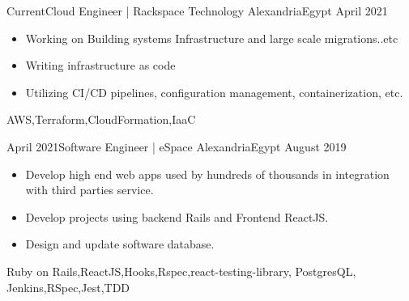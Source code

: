 \begin{experiences}
  \experience
    {Current}{Cloud Engineer | Rackspace Technology }{Alexandria}{Egypt}
    {April 2021}   {
                      \begin{itemize}
                        \item  Working on Building systems Infrastructure and large scale migrations..etc
                        \item Writing infrastructure as code
                        \item Utilizing CI/CD pipelines, configuration management, containerization, etc.
                      \end{itemize}
                    }
                {AWS,Terraform,CloudFormation,IaaC} 
 \emptySeparator

  \experience
    {April 2021}{Software Engineer | eSpace }{Alexandria}{Egypt}
    {August 2019}   {
                      \begin{itemize}
                        \item Develop high end web apps used by hundreds of thousands in integration with third parties service.
                        \item Develop projects using backend Rails and Frontend ReactJS.
                        \item Design and update software database.
                      \end{itemize}
                    }
                    {Ruby on Rails,ReactJS,Hooks,Rspec,react-testing-library, PostgresQL, Jenkins,RSpec,Jest,TDD}                    
\end{experiences}
